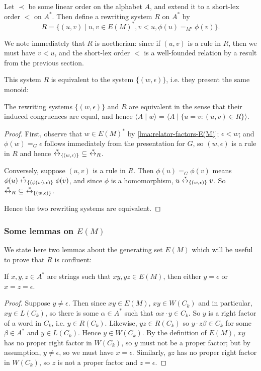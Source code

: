 \documentclass[noindex,noinsetproof,emphthm,12pt]{lmaths}
\newcommand{\leftrightst}{\mathrel{\smash{\stackrel{\hspace{0.1em}\ast}{\leftrightarrow}}}}
\begin{document}
Let $\prec$ be some linear order on the alphabet $A$, and extend it to a short-lex order $<$ on $A^*$. Then define a rewriting system $R$ on $A^*$ by
	\[ R = \{ (u, v) \mid u, v \in E(M)^*, v < u, \phi(u) =_{M'} \phi(v) \}. \]

We note immediately that $R$ is noetherian: since if $(u, v)$ is a rule in $R$, then we must have $v < u$, and the short-lex order $<$ is a well-founded relation by a result from the previous section.

This system $R$ is equivalent to the system $\{(w, \epsilon)\}$, i.e. they present the same monoid:
\begin{lemma} \label{lma:R-equivalent-to-pres}
	The rewriting systems $\{(w, \epsilon)\}$ and $R$ are equivalent in the sense that their induced congruences  are equal, and hence $\langle A \mid w \rangle$ = $\langle A \mid \{u = v : (u, v) \in R\}\rangle$.
\end{lemma}
\begin{proof}
	First, observe that $w \in E(M)^*$ by \cref{lma:relator-factors-E(M)}; $\epsilon < w$; and $\phi(w) =_G \epsilon$ follows immediately from the presentation for $G$, so $(w, \epsilon)$ is a rule in $R$ and hence $\leftrightst_{\{(w,\epsilon)\}}\ \subseteq\ \leftrightst_R$.

Conversely, suppose $(u, v)$ is a rule in $R$. Then $\phi(u) =_G \phi(v)$ means $\phi(u) \leftrightst_{\{(\phi(w), \epsilon)\}} \phi(v)$, and since $\phi$ is a homomorphism, $u \leftrightst_{\{(w, \epsilon)\}} v$. So $\leftrightst_R\ \subseteq\ \leftrightst_{\{(w,\epsilon)\}}$.

Hence the two rewriting systems are equivalent.
\end{proof}


\subsubsection{\texorpdfstring{Some lemmas on $E(M)$}{Some lemmas on E(M)}}

We state here two lemmas about the generating set $E(M)$ which will be useful to prove that $R$ is confluent:

\begin{lemma} \label{lma:no-middle-E(M)}
	If $x, y, z \in A^*$ are strings such that $xy, yz \in E(M)$, then either $y = \epsilon$ or $x = z = \epsilon$.
\end{lemma}
\begin{proof}
	Suppose $y \ne \epsilon$. Then since $xy \in E(M)$, $xy \in W(C_k)$ and in particular, $xy \in L(C_k)$, so there is some $\alpha \in A^*$ such that $\alpha x \cdot y \in C_k$. So $y$ is a right factor of a word in $C_k$, i.e. $y \in R(C_k)$. Likewise, $yz \in R(C_k)$ so $y \cdot z\beta \in C_k$ for some $\beta \in A^*$ and $y \in L(C_k)$. Hence $y \in W(C_k)$. By the definition of $E(M)$, $xy$ has no proper right factor in $W(C_k)$, so $y$ must not be a proper factor; but by assumption, $y \ne \epsilon$, so we must have $x = \epsilon$. Similarly, $yz$ has no proper right factor in $W(C_k)$, so $z$ is not a proper factor and $z = \epsilon$.
\end{proof}
\end{document}
